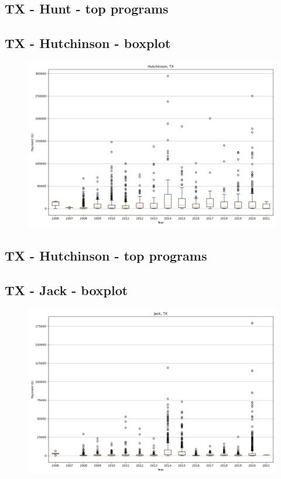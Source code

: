 \subsection*{TX - Hunt - top programs}

\newpage
\subsection*{TX - Hutchinson - boxplot}
\begin{figure}[h]
\centering
\includegraphics[width=7in]{../output/boxplots/counties/Hutchinson-TX_boxplot.png}
\end{figure}


\subsection*{TX - Hutchinson - top programs}

\newpage
\subsection*{TX - Jack - boxplot}
\begin{figure}[h]
\centering
\includegraphics[width=7in]{../output/boxplots/counties/Jack-TX_boxplot.png}
\end{figure}


